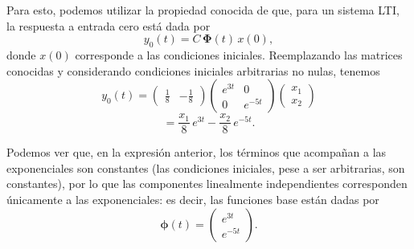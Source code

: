 \documentclass[
  11pt,
  letterpaper,
   addpoints,
   answers
  ]{exam}
\begin{document}
\begin{questions}
\begin{solution}
Para esto, podemos utilizar la propiedad conocida de que, para un sistema LTI, la respuesta a
entrada cero está dada por
\begin{equation}
y_0(t)=C\,\boldsymbol{\Phi}(t)\,x(0),
\end{equation}
donde $x(0)$ corresponde a las condiciones iniciales. Reemplazando las matrices conocidas y considerando
condiciones iniciales arbitrarias no nulas, tenemos
\begin{equation}
y_0(t)=\begin{pmatrix}\frac{1}{8} & -\frac{1}{8}\end{pmatrix}
\begin{pmatrix}
e^{3t} & 0\\
0 & e^{-5t}
\end{pmatrix}
\begin{pmatrix}
x_1\\ x_2
\end{pmatrix}
\end{equation}
\begin{equation}
=\frac{x_1}{8}\,e^{3t}-\frac{x_2}{8}\,e^{-5t}.
\end{equation}

Podemos ver que, en la expresión anterior, los términos que acompañan a las exponenciales
son constantes (las condiciones iniciales, pese a ser arbitrarias, son constantes), por lo que las componentes
linealmente independientes corresponden únicamente a las exponenciales: es decir, las funciones
base están dadas por
\begin{equation}
\boldsymbol{\phi}(t)=
\begin{pmatrix}
e^{3t}\\
e^{-5t}
\end{pmatrix}.
\end{equation}

\end{solution}
\end{questions}
\end{document}
